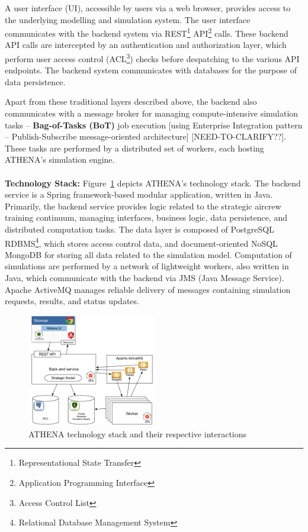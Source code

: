 A user interface (UI), accessible by users via a web browser, provides access to the underlying modelling and simulation system. The user interface communicates with the backend system via REST\footnote{Representational State Transfer} API\footnote{Application Programming Interface} calls. These backend API calls are intercepted by an authentication and authorization layer, which perform user access control (ACL\footnote{Access Control List}) checks before despatching to the various API endpoints. The backend system communicates with databases for the purpose of data persistence.

Apart from these traditional layers described above, the backend also communicates with a message broker for managing compute-intensive simulation tasks -- \textbf{Bag-of-Tasks (BoT)} job execution [using Enterprise Integration pattern -- Publish-Subscribe message-oriented architecture] [NEED-TO-CLARIFY??]. These tasks are performed by a distributed set of workers, each hosting ATHENA's simulation engine.
\\
\\
\textbf{Technology Stack:} \quad Figure~\ref{fig:techStack} depicts ATHENA's technology stack. The backend service is a Spring framework-based modular application, written in Java. Primarily, the backend service provides logic related to the strategic aircrew training continuum, managing interfaces, business logic, data persistence, and distributed computation tasks. The data layer is composed of PostgreSQL RDBMS\footnote{Relational Database Management System}, which stores access control data, and document-oriented NoSQL MongoDB for storing all data related to the simulation model. Computation of simulations are performed by a network of lightweight workers, also written in Java, which communicate with the backend via JMS (Java Message Service). Apache ActiveMQ manages reliable delivery of messages containing simulation requests, results, and status updates. 

\begin{figure}
\centering
\includegraphics[width=0.5\textwidth]{Figures/ATHENA_tech_stack}
\decoRule
\caption[ATHENA Technology Stack]{ATHENA technology stack and their respective interactions}
\label{fig:techStack}
\end{figure}

